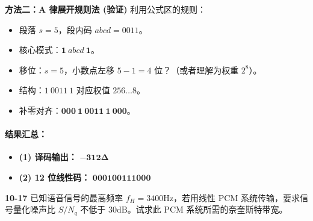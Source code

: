 \documentclass[a4paper,11pt]{ctexart}
\begin{document}
    \textbf{方法二：A 律展开规则法 (验证)}
    利用公式区的规则：
    \begin{itemize}
        \item 段落 $s=5$，段内码 $abcd = 0011$。
        \item 核心模式：$\mathbf{1} \ abcd \ \mathbf{1}$。
        \item 移位：$s=5$，小数点左移 $5-1=4$ 位？（或者理解为权重 $2^8$）。
        \item 结构：$1 \ 0011 \ 1$ 对应权值 $256 \dots 8$。
        \item 补零对齐：$\mathbf{000 \ 1 \ 0011 \ 1 \ 000}$。
    \end{itemize}
    
    \paragraph{结果汇总：}
    \begin{itemize}
        \item \textbf{(1) 译码输出：} $\mathbf{-312\Delta}$
        \item \textbf{(2) 12 位线性码：} $\mathbf{000100111000}$
    \end{itemize}


\noindent \textbf{10-17} 已知语音信号的最高频率 $f_H=3400\text{Hz}$，若用线性 PCM 系统传输，要求信号量化噪声比 $S/N_q$ 不低于 $30\text{dB}$。试求此 PCM 系统所需的奈奎斯特带宽。
\end{document}
